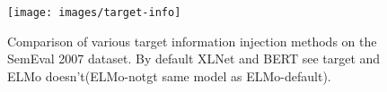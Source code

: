 \documentclass[11pt,a4paper]{article}
\begin{document}
\begin{figure}[!h]
\begin{center}
\texttt{[image: images/target-info]}
\caption{Comparison of various target information injection methods on the SemEval 2007 dataset. By default XLNet and BERT see target and ELMo doesn't(ELMo-notgt same model as ELMo-default). }
\label{fig:target-info}
\end{center}
\end{figure}







\end{document}
